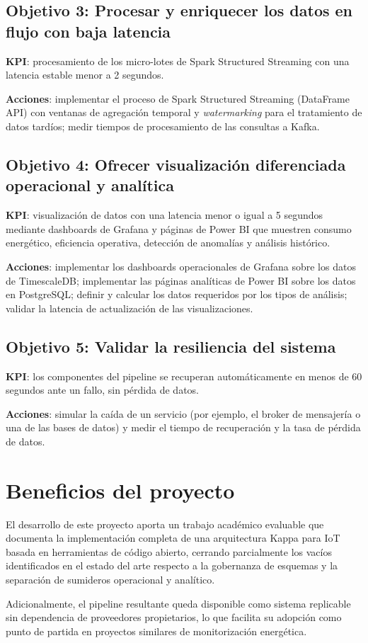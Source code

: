 \subsection{Objetivo 3: Procesar y enriquecer los datos en flujo con baja latencia}

\textbf{KPI}: procesamiento de los micro-lotes de Spark Structured Streaming con una latencia estable menor a 2 segundos.

\textbf{Acciones}: implementar el proceso de Spark Structured Streaming (DataFrame API) con ventanas de agregación temporal y \textit{watermarking} para el tratamiento de datos tardíos; medir tiempos de procesamiento de las consultas a Kafka.

\subsection{Objetivo 4: Ofrecer visualización diferenciada operacional y analítica}

\textbf{KPI}: visualización de datos con una latencia menor o igual a 5 segundos mediante dashboards de Grafana y páginas de Power BI que muestren consumo energético, eficiencia operativa, detección de anomalías y análisis histórico.

\textbf{Acciones}: implementar los dashboards operacionales de Grafana sobre los datos de TimescaleDB; implementar las páginas analíticas de Power BI sobre los datos en PostgreSQL; definir y calcular los datos requeridos por los tipos de análisis; validar la latencia de actualización de las visualizaciones.

\subsection{Objetivo 5: Validar la resiliencia del sistema}

\textbf{KPI}: los componentes del pipeline se recuperan automáticamente en menos de 60 segundos ante un fallo, sin pérdida de datos.

\textbf{Acciones}: simular la caída de un servicio (por ejemplo, el broker de mensajería o una de las bases de datos) y medir el tiempo de recuperación y la tasa de pérdida de datos.

\section{Beneficios del proyecto}

El desarrollo de este proyecto aporta un trabajo académico evaluable que documenta la implementación completa de una arquitectura Kappa para IoT basada en herramientas de código abierto, cerrando parcialmente los vacíos identificados en el estado del arte respecto a la gobernanza de esquemas y la separación de sumideros operacional y analítico. 

Adicionalmente, el pipeline resultante queda disponible como sistema replicable sin dependencia de proveedores propietarios, lo que facilita su adopción como punto de partida en proyectos similares de monitorización energética.

